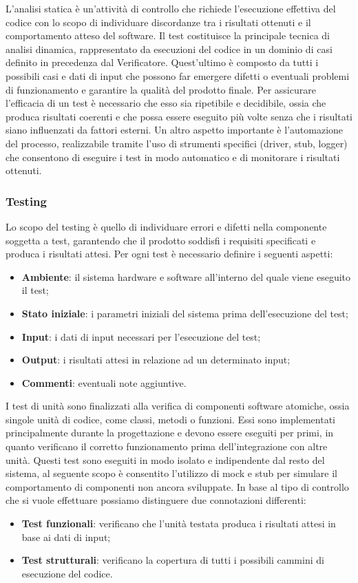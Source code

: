 L'analisi statica è un'attività di controllo che richiede l'esecuzione effettiva del codice con lo scopo di
individuare discordanze tra i risultati ottenuti e il comportamento atteso del software. Il test costituisce
la principale tecnica di analisi dinamica, rappresentato da esecuzioni del codice in un dominio di casi definito in precedenza dal Verificatore.
Quest'ultimo è composto da tutti i possibili casi e dati di input che possono far emergere difetti o eventuali problemi di funzionamento e
garantire la qualità del prodotto finale. Per assicurare l'efficacia di un test è necessario
che esso sia ripetibile e decidibile, ossia che produca risultati coerenti e che possa essere eseguito più volte senza che
i risultati siano influenzati da fattori esterni. Un altro aspetto importante è l'automazione del processo, realizzabile tramite l'uso di
strumenti specifici (driver, stub, logger) che consentono di eseguire i test in modo automatico e di monitorare i risultati ottenuti.

\subsubsection{Testing} \label{testing}
Lo scopo del testing è quello di individuare errori e difetti nella componente soggetta a test,
garantendo che il prodotto soddisfi i requisiti specificati e produca i risultati attesi. Per ogni test
è necessario definire i seguenti aspetti:
\begin{itemize}
	\item \textbf{Ambiente}: il sistema hardware e software all'interno del quale viene eseguito il test;
	\item \textbf{Stato iniziale}: i parametri iniziali del sistema prima dell'esecuzione del test;
	\item \textbf{Input}: i dati di input necessari per l'esecuzione del test;
	\item \textbf{Output}: i risultati attesi in relazione ad un determinato input;
	\item \textbf{Commenti}: eventuali note aggiuntive.
\end{itemize}

I test di unità sono finalizzati alla verifica di componenti software
atomiche, ossia singole unità di codice, come classi, metodi o funzioni. Essi sono implementati principalmente durante la progettazione e
devono essere eseguiti per primi, in quanto verificano il corretto funzionamento prima dell'integrazione con altre unità. Questi
test sono eseguiti in modo isolato e indipendente dal resto del sistema,
al seguente scopo è consentito l'utilizzo di mock e stub per simulare il comportamento di componenti non ancora sviluppate. In base al tipo
di controllo che si vuole effettuare possiamo distinguere due connotazioni differenti:
\begin{itemize}
	\item \textbf{Test funzionali}: verificano che l'unità testata produca i risultati attesi in base ai dati di input;
	\item \textbf{Test strutturali}: verificano la copertura di tutti i possibili cammini di esecuzione del codice.
\end{itemize}

